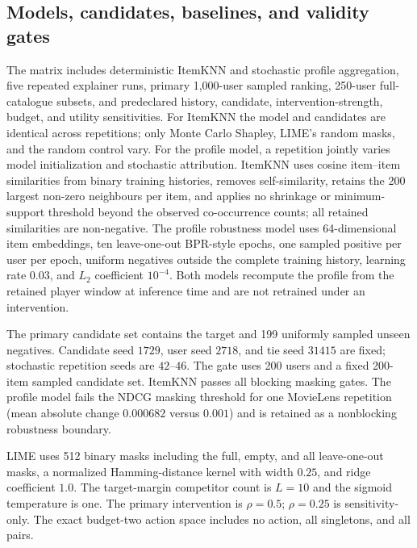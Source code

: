\documentclass[pdflatex,sn-mathphys-num]{sn-jnl}
\begin{document}
\subsection{Models, candidates, baselines, and validity gates}
The matrix includes deterministic ItemKNN and stochastic profile aggregation, five repeated explainer runs, primary 1,000-user sampled ranking, 250-user full-catalogue subsets, and predeclared history, candidate, intervention-strength, budget, and utility sensitivities. For ItemKNN the model and candidates are identical across repetitions; only Monte Carlo Shapley, LIME's random masks, and the random control vary. For the profile model, a repetition jointly varies model initialization and stochastic attribution. ItemKNN uses cosine item--item similarities from binary training histories, removes self-similarity, retains the 200 largest non-zero neighbours per item, and applies no shrinkage or minimum-support threshold beyond the observed co-occurrence counts; all retained similarities are non-negative. The profile robustness model uses 64-dimensional item embeddings, ten leave-one-out BPR-style epochs, one sampled positive per user per epoch, uniform negatives outside the complete training history, learning rate $0.03$, and $L_2$ coefficient $10^{-4}$. Both models recompute the profile from the retained player window at inference time and are not retrained under an intervention.

The primary candidate set contains the target and 199 uniformly sampled unseen negatives. Candidate seed $1729$, user seed $2718$, and tie seed $31415$ are fixed; stochastic repetition seeds are $42$--$46$. The gate uses 200 users and a fixed 200-item sampled candidate set. ItemKNN passes all blocking masking gates. The profile model fails the NDCG masking threshold for one MovieLens repetition (mean absolute change $0.000682$ versus $0.001$) and is retained as a nonblocking robustness boundary.

LIME uses 512 binary masks including the full, empty, and all leave-one-out masks, a normalized Hamming-distance kernel with width $0.25$, and ridge coefficient $1.0$. The target-margin competitor count is $L=10$ and the sigmoid temperature is one. The primary intervention is $\rho=0.5$; $\rho=0.25$ is sensitivity-only. The exact budget-two action space includes no action, all singletons, and all pairs.
\end{document}
